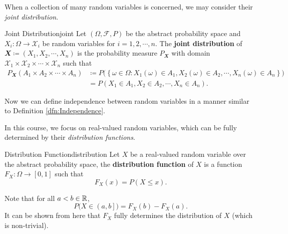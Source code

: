 \documentclass[math, code]{amznotes}
\theoremstyle{remark}
\begin{document}
When a collection of many random variables is concerned, we may consider their \textit{joint distribution}.
\begin{dfnbox}{Joint Distribution}{joint}
    Let $\left(\Omega, \mathcal{F}, P\right)$ be the abstract probability space and $X_i \colon \Omega \to \mathcal{X}_i$ be random variables for $i = 1, 2, \cdots, n$. The {\color{red} \textbf{joint distribution}} of $\mathbfit{X} \coloneqq \left(X_1, X_2, \cdots, X_n\right)$ is the probability measure $P_{\mathbfit{X}}$ with domain $\mathcal{X}_1 \times \mathcal{X}_2 \times \cdots \times \mathcal{X}_n$ such that 
    \begin{align*}
        P_{\mathbfit{X}}\left(A_1 \times A_2 \times \cdots \times A_n\right) & \coloneqq P\bigl(\left\{\omega \in \Omega \colon X_1\left(\omega\right) \in A_1, X_2\left(\omega\right) \in A_2, \cdots, X_n\left(\omega\right) \in A_n\right\}\bigr) \\
        & = P\left(X_1 \in A_1, X_2 \in A_2, \cdots, X_n \in A_n\right).
    \end{align*}
\end{dfnbox}
Now we can define independence between random variables in a manner similar to Definition \ref{dfn:Independence}.

In this course, we focus on real-valued random variables, which can be fully determined by their \textit{distribution functions}.
\begin{dfnbox}{Distribution Function}{distribution}
    Let $X$ be a real-valued random variable over the abstract probability space, the {\color{red} \textbf{distribution function}} of $X$ is a function $F_X \colon \Omega \to \left[0, 1\right]$ such that 
    \begin{equation*}
        F_X\left(x\right) = P\left(X \leq x\right).
    \end{equation*}
\end{dfnbox}
Note that for all $a < b \in \mathbb{R}$, 
\begin{equation*}
    P\bigl(X \in \left(a, b\right]\bigr) = F_X\left(b\right) - F_X\left(a\right).
\end{equation*}
It can be shown from here that $F_X$ fully determines the distribution of $X$ (which is non-trivial).
\end{document}
